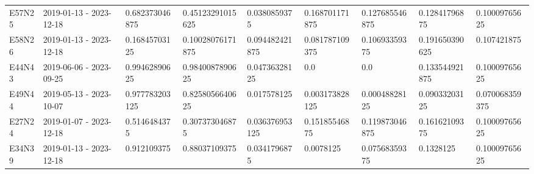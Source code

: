 \begin{landscape}
\begin{longtable}{lllllllll}
E57N25 & 2019-01-13 - 2023-12-18 & 0.682373046875 & 0.45123291015625 & 0.0380859375 & 0.168701171875 & 0.127685546875 & 0.12841796875 & 0.10009765625 \\
E58N26 & 2019-01-13 - 2023-12-18 & 0.16845703125 & 0.10028076171875 & 0.094482421875 & 0.081787109375 & 0.10693359375 & 0.191650390625 & 0.107421875 \\
E44N43 & 2019-06-06 - 2023-09-25 & 0.99462890625 & 0.9840087890625 & 0.04736328125 & 0.0 & 0.0 & 0.133544921875 & 0.10009765625 \\
E49N44 & 2019-05-13 - 2023-10-07 & 0.977783203125 & 0.8258056640625 & 0.017578125 & 0.003173828125 & 0.00048828125 & 0.09033203125 & 0.070068359375 \\
E27N24 & 2019-01-07 - 2023-12-18 & 0.5146484375 & 0.307373046875 & 0.036376953125 & 0.15185546875 & 0.119873046875 & 0.16162109375 & 0.10009765625 \\
E34N39 & 2019-01-13 - 2023-12-18 & 0.912109375 & 0.88037109375 & 0.0341796875 & 0.0078125 & 0.07568359375 & 0.1328125 & 0.10009765625 \\
\bottomrule
\end{longtable}
\end{landscape}

